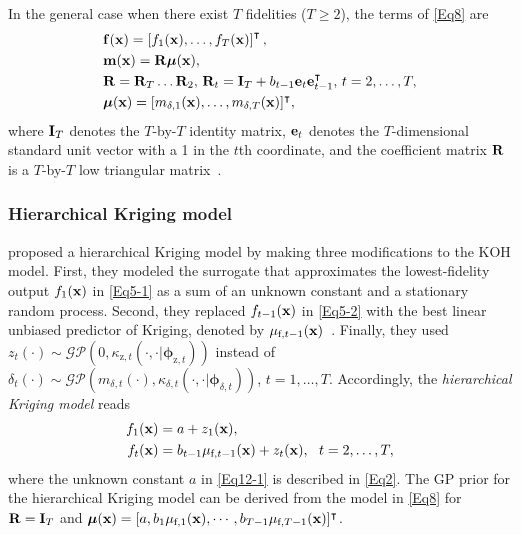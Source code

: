 \documentclass[iicol,sn-basic]{sn-jnl}%
\begin{document}
In the general case when there exist $T$ fidelities ($T \geq 2$), the terms of \cref{Eq8} are
\begin{subequations}\label{Eq11}
	\begin{align}
		&{\bf f}({\bf x}) = \left[f_1({\bf x}),\dots,f_T({\bf x})\right]^\intercal, \label{Eq11-1}\\
		& {\bf m}({\bf x}) = {\bf R} \boldsymbol{\mu}({\bf x}), \label{Eq11-2}\\
		& {\bf R} = {\bf R}_T\dots {\bf R}_2, \, {\bf R}_t = {\bf I}_T + b_{t-1} {\bf e}_t {\bf e}^\intercal_{t-1}, \, t=2,\dots,T, \label{Eq11-3}\\
 		& \boldsymbol{\mu}({\bf x}) = [m_{\delta,1}({\bf x}),\dots,m_{\delta,T}({\bf x})]^\intercal \label{Eq11-4},
	\end{align}
\end{subequations}
where ${\bf I}_T$ denotes the $T$-by-$T$ identity matrix, ${\bf e}_t$ denotes the $T$-dimensional standard unit vector with a 1 in the $t$th coordinate, and the coefficient matrix ${\bf R}$ is a $T$-by-$T$ low triangular matrix~\citep{Garland2020}.

\subsubsection{Hierarchical Kriging model}\label{Sec422}

\cite{Han2012} proposed a hierarchical Kriging model by making three modifications to the KOH model.
First, they modeled the surrogate that approximates the lowest-fidelity output $f_1({\bf x})$ in \cref{Eq5-1} as a sum of an unknown constant and a stationary random process.
Second, they replaced $f_{t-1}({\bf x})$ in \cref{Eq5-2} with the best linear unbiased predictor of Kriging, denoted by $\mu_{\text{f},t-1}({\bf x})$~\citep{Sacks1989}.
Finally, they used $z_t({\cdot}) \sim \mathcal{GP}\left(0,\kappa_{\text{z},t}(\cdot,\cdot|{\boldsymbol \phi}_{\text{z},t})\right)$ instead of $\delta_{t}(\cdot) \sim \mathcal{GP}\left(m_{\delta,t}(\cdot),\kappa_{\delta,t}(\cdot,\cdot|{\boldsymbol \phi}_{\delta,t})\right)$, $t=1,\dots,T$.
Accordingly, the \textit{hierarchical Kriging model} reads
\begin{subequations}\label{Eq12}
	\begin{align}
		f_1({\bf x}) & = a + z_1({\bf x}) 
		\label{Eq12-1},\\
		f_t({\bf x}) & =
		b_{t-1} \mu_{\text{f},t-1}({\bf x}) + z_{t}({\bf x}), \ \  t=2,\dots,T
		\label{Eq12-2},
	\end{align}
\end{subequations}
where the unknown constant $a$ in \cref{Eq12-1} is described in \cref{Eq2}.
The GP prior for the hierarchical Kriging model can be derived from the model in \cref{Eq8} for ${\bf R}={\bf I}_T$ and $\boldsymbol{\mu}({\bf x}) = [a,b_1 \mu_{\text{f},1}({\bf x}),\cdots,b_{T-1} \mu_{\text{f},T-1}({\bf x})]^\intercal$.
\end{document}
